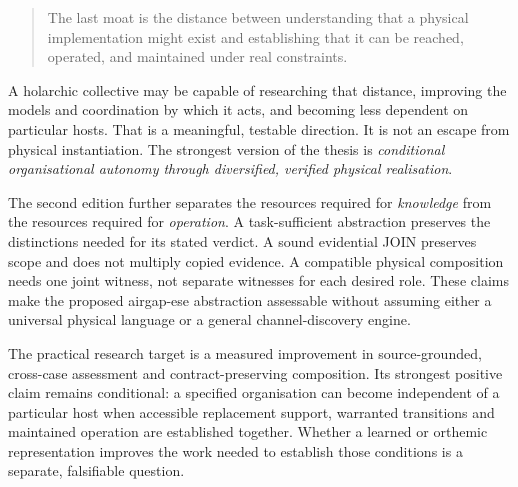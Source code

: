 \documentclass[11pt,a4paper]{article}
\theoremstyle{definition}
\theoremstyle{remark}
\begin{document}
\begin{quote}
The last moat is the distance between understanding that a physical implementation might exist and establishing that it can be reached, operated, and maintained under real constraints.
\end{quote}
A holarchic collective may be capable of researching that distance, improving the models and coordination by which it acts, and becoming less dependent on particular hosts. That is a meaningful, testable direction. It is not an escape from physical instantiation. The strongest version of the thesis is \emph{conditional organisational autonomy through diversified, verified physical realisation}.


The second edition further separates the resources required for \emph{knowledge} from the resources required for \emph{operation}. A task-sufficient abstraction preserves the distinctions needed for its stated verdict. A sound evidential JOIN preserves scope and does not multiply copied evidence. A compatible physical composition needs one joint witness, not separate witnesses for each desired role. These claims make the proposed airgap-ese abstraction assessable without assuming either a universal physical language or a general channel-discovery engine.

The practical research target is a measured improvement in source-grounded, cross-case assessment and contract-preserving composition. Its strongest positive claim remains conditional: a specified organisation can become independent of a particular host when accessible replacement support, warranted transitions and maintained operation are established together. Whether a learned or orthemic representation improves the work needed to establish those conditions is a separate, falsifiable question.


\appendix
\end{document}
